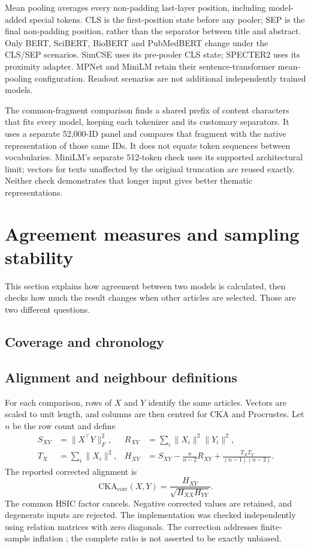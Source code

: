 \documentclass[12pt]{article}
\begin{document}
Mean pooling averages every non-padding last-layer position, including model-added special tokens. CLS is the first-position state before any pooler; SEP is the final non-padding position, rather than the separator between title and abstract. Only BERT, SciBERT, BioBERT and PubMedBERT change under the CLS/SEP scenarios. SimCSE uses its pre-pooler CLS state; SPECTER2 uses its proximity adapter. MPNet and MiniLM retain their sentence-transformer mean-pooling configuration. Readout scenarios are not additional independently trained models.

The common-fragment comparison finds a shared prefix of content characters that fits every model, keeping each tokenizer and its customary separators. It uses a separate 52,000-ID panel and compares that fragment with the native representation of those same IDs. It does not equate token sequences between vocabularies. MiniLM's separate 512-token check uses its supported architectural limit; vectors for texts unaffected by the original truncation are reused exactly. Neither check demonstrates that longer input gives better thematic representations.
\clearpage

\FloatBarrier

\section{Agreement measures and sampling stability}
This section explains how agreement between two models is calculated, then checks how much the result changes when other articles are selected. Those are two different questions.

\subsection{Coverage and chronology}

\subsection{Alignment and neighbour definitions}
For each comparison, rows of $X$ and $Y$ identify the same articles. Vectors are scaled to unit length, and columns are then centred for CKA and Procrustes. Let $n$ be the row count and define
\begin{align*}
S_{XY}&=\lVert X^\top Y\rVert_F^2, &
R_{XY}&=\sum_i\lVert X_i\rVert^2\lVert Y_i\rVert^2,\\
T_X&=\sum_i\lVert X_i\rVert^2, &
H_{XY}&=S_{XY}-\frac{n}{n-2}R_{XY}
+\frac{T_XT_Y}{(n-1)(n-2)}.
\end{align*}
The reported corrected alignment is
\[
\mathrm{CKA}_{\mathrm{corr}}(X,Y)=\frac{H_{XY}}{\sqrt{H_{XX}H_{YY}}}.
\]
The common HSIC factor cancels. Negative corrected values are retained, and degenerate inputs are rejected. The implementation was checked independently using relation matrices with zero diagonals. The correction addresses finite-sample inflation \citep{pmlr-v97-kornblith19a,refa961d84a4e}; the complete ratio is not asserted to be exactly unbiased.
\end{document}
